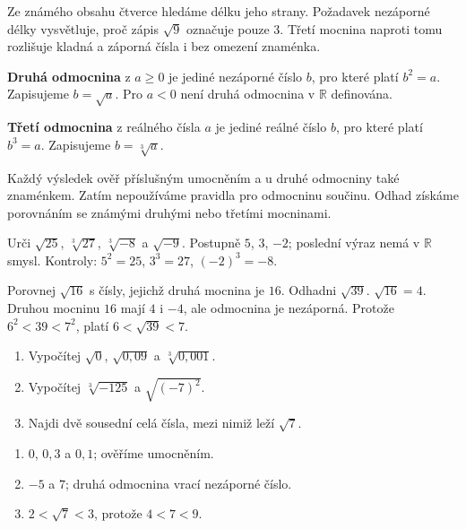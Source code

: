 \documentclass[11pt,a4paper]{article}
\begin{document}

Ze známého obsahu čtverce hledáme délku jeho strany. Požadavek nezáporné délky vysvětluje, proč zápis $\sqrt9$ označuje pouze $3$. Třetí mocnina naproti tomu rozlišuje kladná a záporná čísla i bez omezení znaménka.

\begin{definiceBox}[title={Definice},breakable=false]
\textbf{Druhá odmocnina} z $a\ge0$ je jediné nezáporné číslo $b$, pro které platí $b^2=a$. Zapisujeme $b=\sqrt a$. Pro $a<0$ není druhá odmocnina v $\mathbb R$ definována.
\end{definiceBox}


\begin{definiceBox}[title={Definice},breakable=false]
\textbf{Třetí odmocnina} z reálného čísla $a$ je jediné reálné číslo $b$, pro které platí $b^3=a$. Zapisujeme $b=\sqrt[3]a$.
\end{definiceBox}


Každý výsledek ověř příslušným umocněním a u druhé odmocniny také znaménkem. Zatím nepoužíváme pravidla pro odmocninu součinu. Odhad získáme porovnáním se známými druhými nebo třetími mocninami.


\begin{prikladReseniBox}[title={Příklad 1},breakable=false]
Urči $\sqrt{25}$, $\sqrt[3]{27}$, $\sqrt[3]{-8}$ a $\sqrt{-9}$.
\tcblower
Postupně $5$, $3$, $-2$; poslední výraz nemá v $\mathbb R$ smysl. Kontroly: $5^2=25$, $3^3=27$, $(-2)^3=-8$.
\end{prikladReseniBox}


\begin{prikladReseniBox}[title={Příklad 2},breakable=false]
Porovnej $\sqrt{16}$ s čísly, jejichž druhá mocnina je $16$. Odhadni $\sqrt{39}$.
\tcblower
$\sqrt{16}=4$. Druhou mocninu $16$ mají $4$ i $-4$, ale odmocnina je nezáporná. Protože $6^2<39<7^2$, platí $6<\sqrt{39}<7$.
\end{prikladReseniBox}



\begin{zadaniReseniBox}[title={Procvičení},breakable=false]
\begin{enumerate}[label=\alph*)]
\item Vypočítej $\sqrt{0}$, $\sqrt{0{,}09}$ a $\sqrt[3]{0{,}001}$.
\item Vypočítej $\sqrt[3]{-125}$ a $\sqrt{(-7)^2}$.
\item Najdi dvě sousední celá čísla, mezi nimiž leží $\sqrt7$.
\end{enumerate}
\tcblower
\begin{enumerate}[label=\alph*)]
\item $0$, $0{,}3$ a $0{,}1$; ověříme umocněním.
\item $-5$ a $7$; druhá odmocnina vrací nezáporné číslo.
\item $2<\sqrt7<3$, protože $4<7<9$.
\end{enumerate}
\end{zadaniReseniBox}
\end{document}
